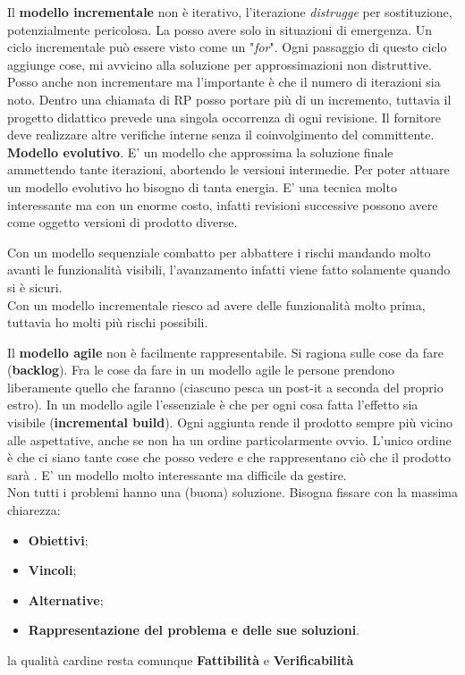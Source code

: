 Il \textbf{modello incrementale} non è iterativo, l'iterazione \textit{distrugge} per sostituzione, potenzialmente pericolosa. La posso avere solo in situazioni di emergenza. Un ciclo incrementale può essere visto come un "\textit{for}". Ogni passaggio di questo ciclo aggiunge cose, mi avvicino alla soluzione per approssimazioni non distruttive. Posso anche non incrementare ma l'importante è che il numero di iterazioni sia noto. Dentro una chiamata di RP posso portare più di un incremento, tuttavia il progetto didattico prevede una singola occorrenza di ogni revisione. Il fornitore deve realizzare altre verifiche interne senza il coinvolgimento del committente.\\

\textbf{Modello evolutivo}. E' un modello che approssima la soluzione finale ammettendo tante iterazioni, abortendo le versioni intermedie. Per poter attuare un modello evolutivo ho bisogno di tanta energia. E' una tecnica molto interessante ma con un enorme costo, infatti revisioni successive possono avere come oggetto versioni di prodotto diverse.


Con un modello sequenziale combatto per abbattere i rischi mandando molto avanti le funzionalità visibili, l'avanzamento infatti viene fatto solamente quando si è sicuri.\\
Con un modello incrementale riesco ad avere delle funzionalità molto prima, tuttavia ho molti più rischi possibili.

Il \textbf{modello agile} non è facilmente rappresentabile. Si ragiona sulle cose da fare (\textbf{backlog}). Fra le cose da fare in un modello agile le persone prendono liberamente quello che faranno (ciascuno pesca un post-it a seconda del proprio estro). In un modello agile l'essenziale è che per ogni cosa fatta l'effetto sia visibile (\textbf{incremental build}). Ogni aggiunta rende il prodotto sempre più vicino alle aspettative, anche se non ha un ordine particolarmente ovvio. L'unico ordine è che ci siano tante cose che posso vedere e che rappresentano ciò che il prodotto sarà . E' un modello molto interessante ma difficile da gestire.\\

Non tutti i problemi hanno una (buona) soluzione. Bisogna fissare con la massima chiarezza:

\begin{itemize}

	\item \textbf{Obiettivi};
	\item \textbf{Vincoli};
	\item \textbf{Alternative};
	\item \textbf{Rappresentazione del problema e delle sue soluzioni}.

\end{itemize}
la qualità cardine resta comunque \textbf{Fattibilità} e \textbf{Verificabilità}

